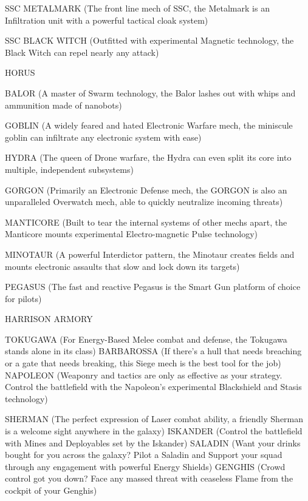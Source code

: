 SSC METALMARK (The front line mech of SSC, the Metalmark is an Infiltration unit with a  
powerful tactical cloak system)
 
SSC BLACK WITCH (Outfitted with experimental Magnetic technology, the Black Witch can  
repel nearly any attack)
 

                                             HORUS  

                                                                                                      


BALOR (A master of Swarm technology, the Balor lashes out with whips and ammunition made  
of nanobots) 
 
GOBLIN (A widely feared and hated Electronic Warfare mech, the miniscule goblin can infiltrate  
any electronic system with ease)
 
HYDRA (The queen of Drone warfare, the Hydra can even split its core into multiple,  
independent subsystems)
 
GORGON (Primarily an Electronic Defense mech, the GORGON is also an unparalleled  
Overwatch mech, able to quickly neutralize incoming threats)
 
MANTICORE (Built to tear the internal systems of other mechs apart, the Manticore mounts  
experimental Electro-magnetic Pulse technology)
 
MINOTAUR (A powerful Interdictor pattern, the Minotaur creates fields and mounts electronic  
assaults that slow and lock down its targets)
 
PEGASUS (The fast and reactive Pegasus is the Smart Gun platform of choice for pilots)
 

                                   HARRISON ARMORY  

TOKUGAWA (For Energy-Based Melee combat and defense, the Tokugawa stands alone in its  
class)  
BARBAROSSA (If there’s a hull that needs breaching or a gate that needs breaking, this Siege  
mech is the best tool for the job)  
NAPOLEON (Weaponry and tactics are only as effective as your strategy. Control the battlefield  
with the Napoleon’s experimental Blackshield and Stasis technology)
 
SHERMAN (The perfect expression of Laser combat ability, a friendly Sherman is a welcome  
sight anywhere in the galaxy)  
ISKANDER (Control the battlefield with Mines and Deployables set by the Iskander)  
SALADIN (Want your drinks bought for you across the galaxy? Pilot a Saladin and Support your  
squad through any engagement with powerful Energy Shields)  
GENGHIS (Crowd control got you down? Face any massed threat with ceaseless Flame from  
the cockpit of your Genghis)  

                                                   